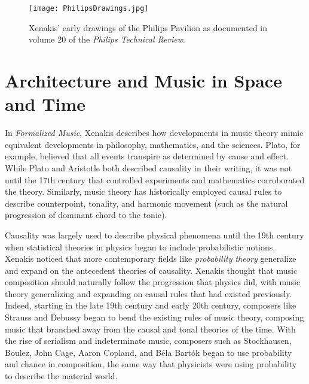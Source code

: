 \begin{figure*}[h]
  \texttt{[image: PhilipsDrawings.jpg]}
  \caption{Xenakis' early drawings of the Philips Pavilion as
    documented in volume 20 of the \textit{Philips Technical Review}.}
  \label{fig:xenakis-draw}
\end{figure*}

\section{Architecture and Music in Space and Time}
\label{sec:introduction-conclusion}

In \textit{Formalized Music}\cite{xenakis1992formalized}, Xenakis
describes how developments in music theory mimic equivalent
developments in philosophy, mathematics, and the sciences. Plato, for
example, believed that all events transpire as determined by cause and
effect. While Plato and Aristotle both described causality in their
writing, it was not until the 17th century that controlled experiments
and mathematics corroborated the theory.
Similarly, music theory has historically employed causal rules to
describe counterpoint, tonality, and harmonic movement (such as the
natural progression of dominant chord to the tonic).

Causality was largely used to describe physical phenomena until the
19th century when statistical theories in physics began to include
probabilistic notions. Xenakis
noticed that more contemporary fields like \emph{probability theory}
generalize and expand on the antecedent theories of causality. Xenakis
thought that music composition should naturally follow the progression
that physics did, with music theory generalizing and expanding on
causal rules that had existed previously. Indeed, starting in the late
19th century and early 20th century, composers like Strauss and
Debussy began to bend the existing rules of music theory, composing
music that branched away from the causal and tonal theories of the
time. With the rise of serialism  and indeterminate music,
composers such as Stockhausen, Boulez, John Cage, Aaron Copland, and
B\'{e}la Bart\'{o}k began to use probability and chance in
composition, the same way that physicists were using probability to
describe the material world. 

